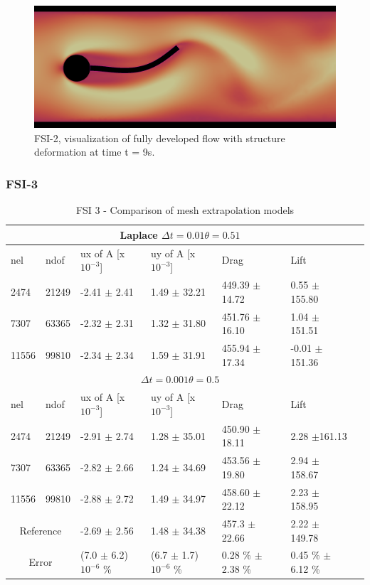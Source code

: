 \begin{figure}[h!]
  \centering
    \includegraphics[scale=0.2]{./Fig/fsi2flow.png}
      \caption{FSI-2, visualization of fully developed flow with structure deformation at time t = 9s.}
\end{figure}
\newpage
\subsubsection{FSI-3}
\begin{table}[h!]
\centering
\caption{FSI 3 - Comparison of mesh extrapolation models}
\label{my-label}
\begin{tabular}{ |p{1cm}||p{1cm}|p{3.2cm}|p{3.2cm}|p{2.9cm}|p{3.1cm}|p{1.2cm}|}
 \hline
  \multicolumn{6}{|c|}{Laplace \hspace{2mm} $\Delta t = 0.01 \theta = 0.51$} \\
   \hline
nel & ndof & ux of A [x $10^{-3}$]  &uy of A [x $10^{-3}$]& Drag  & Lift \\
 \hline
 2474    & 21249  & -2.41 $\pm$   2.41 & 1.49     $\pm$   32.21 & 449.39       $\pm$   14.72 & 0.55 $\pm$   155.80  \\
 7307    & 63365  & -2.32    $\pm$   2.31 & 1.32 $\pm$    31.80 & 451.76  $\pm$   16.10 & 1.04      $\pm$   151.51  \\
 11556   & 99810  & -2.34  $\pm$   2.34  & 1.59   $\pm$  31.91 & 455.94       $\pm$ 17.34 & -0.01   $\pm$   151.36 \\
 \hline
  \multicolumn{6}{|c|}{$\Delta t = 0.001 \theta = 0.5$} \\
   \hline
 nel & ndof & ux of A [x $10^{-3}$]  &uy of A [x $10^{-3}$]& Drag  & Lift \\
    \hline
 2474    & 21249  & -2.91     $\pm$   2.74 & 1.28   $\pm$   35.01 & 450.90      $\pm$  18.11 & 2.28       $\pm$161.13 \\
 7307    & 63365  & -2.82    $\pm$   2.66& 1.24     $\pm$   34.69 & 453.56       $\pm$ 19.80 & 2.94     $\pm$ 158.67 \\
 11556   & 99810  & -2.88     $\pm$   2.72 & 1.49   $\pm$ 34.97 & 458.60   $\pm$ 22.12 & 2.23    $\pm$ 158.95 \\
 \hline
  \multicolumn{2}{|c|}{Reference} & -2.69 $\pm$  2.56                    & 1.48  $\pm$  34.38                   & 457.3  $\pm$  22.66        & 2.22  $\pm$ 149.78           \\
  \hline
    \multicolumn{2}{|c|}{Error}  & (7.0 $\pm$ 6.2)$10^{-6}$  \% & (6.7 $\pm$ 1.7)$10^{-6}$  \% & 0.28 \% $\pm$ 2.38 \% & 0.45 \% $\pm$ 6.12 \%\\
   \hline
\end{tabular}
\end{table}
